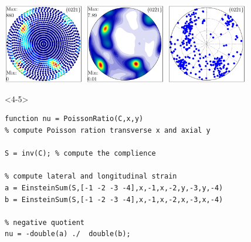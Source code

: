 \documentclass[comptress]{beamer}
\begin{document}
\begin{frame}[fragile]
\begin{overlayarea}{\textwidth}{5.5cm}
\begin{onlyenv}
  \centerline{
  \includegraphics[height=3.5cm]{pic/pf1}
  \quad
  \includegraphics[height=3.5cm]{pic/pdf1}
  \quad
  \includegraphics[height=3.5cm]{pic/ebsd1}
  }
\end{onlyenv}

\begin{onlyenv}<4-5>
  \vspace{-0.3cm}
      \begin{lstlisting}[type=input]
function nu = PoissonRatio(C,x,y)
% compute Poisson ration transverse x and axial y

S = inv(C); % compute the complience

% compute lateral and longitudinal strain
a = EinsteinSum(S,[-1 -2 -3 -4],x,-1,x,-2,y,-3,y,-4)
b = EinsteinSum(S,[-1 -2 -3 -4],x,-1,x,-2,x,-3,x,-4)

% negative quotient
nu = -double(a) ./  double(b);
    \end{lstlisting}
\end{onlyenv}

\end{overlayarea}

\end{frame}
\end{document}
